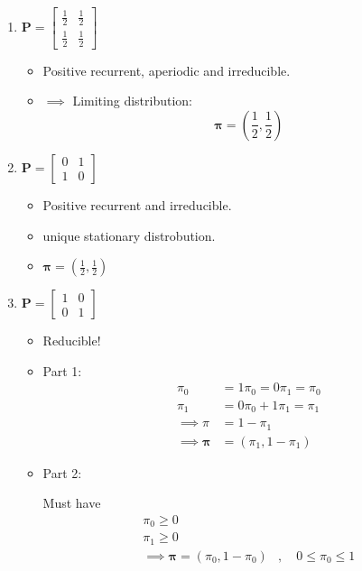 \documentclass{article}
\theoremstyle{remark}
\newcommand{\newpara}
  {
  \vskip 0.4cm
  }
\begin{document}
\begin{enumerate}[label=(\roman*)]
  \item $\mathbf{P } = \begin{bmatrix} 
  \frac{1}{2}  &  \frac{1}{2} \\
  \frac{1}{2}  &  \frac{1}{2} 
  \end{bmatrix} 
  $
  
  \newpara
  \begin{itemize}
    \item 
  Positive recurrent, aperiodic  and irreducible. 
\item 
  $\implies $ Limiting distribution: \[
  \mathbf{\pi } = \left( \frac{1}{2}, \frac{1}{2} \right)
  \] 
  \end{itemize}
\item $\mathbf{P} = \begin{bmatrix} 
0  &  1 \\
1  &  0
\end{bmatrix} 
$
\begin{itemize}
  \item Positive recurrent and irreducible.
  \item unique stationary distrobution.
  \item $\mathbf{\pi } = \left( \frac{1}{2} , \frac{1}{2} \right)$
\end{itemize}

\item $\mathbf{P} = \begin{bmatrix} 
1  &  0 \\
0  &  1
\end{bmatrix} 
$

\begin{itemize}
  \item Reducible!
  \item Part 1: \[
      \begin{split}
  \pi _{0}  & = 1 \pi _{0} = 0 \pi _{1} = \pi _{0} \\
  \pi _{1}  & = 0 \pi _{0} + 1 \pi _{1} = \pi _{1} \\
  \implies  \pi _{}  & = 1 - \pi _{1} \\
  \implies  \mathbf{\pi }  & = \left( \pi _{1} , 1 - \pi _{1} \right)
      \end{split} 
  \] 
\item Part 2: 

\newpara
Must have \[
\begin{split}
  \pi _{0} \ge 0 \\
  \pi _{1 } \ge 0 \\
  \implies  \mathbf{\pi } =  \left( \pi _{0} , 1- \pi _{0}  \right)  & , \quad 0\le \pi _{0} \le 1 
\end{split} 
\] 
\end{itemize}
\end{enumerate}
\end{document}
